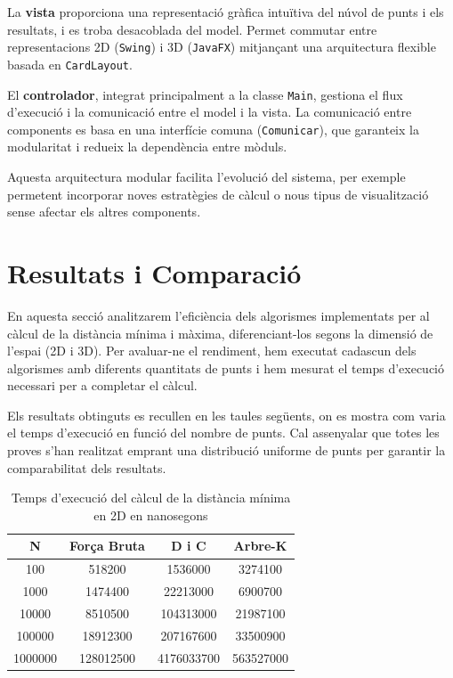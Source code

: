 \documentclass{ieeetj}
\begin{document}
La \textbf{vista} proporciona una representació gràfica intuïtiva del núvol de punts i els resultats, i es troba desacoblada del model. Permet commutar entre representacions 2D (\texttt{Swing}) i 3D (\texttt{JavaFX}) mitjançant una arquitectura flexible basada en \texttt{CardLayout}.

El \textbf{controlador}, integrat principalment a la classe \texttt{Main}, gestiona el flux d’execució i la comunicació entre el model i la vista. La comunicació entre components es basa en una interfície comuna (\texttt{Comunicar}), que garanteix la modularitat i redueix la dependència entre mòduls.

Aquesta arquitectura modular facilita l’evolució del sistema, per exemple permetent incorporar noves estratègies de càlcul o nous tipus de visualització sense afectar els altres components.




\section{Resultats i Comparació}

 En aquesta secció analitzarem l'eficiència dels algorismes implementats per al càlcul de la distància mínima i màxima, diferenciant-los segons la dimensió de l'espai (2D i 3D). Per avaluar-ne el rendiment, hem executat cadascun dels algorismes amb diferents quantitats de punts i hem mesurat el temps d'execució necessari per a completar el càlcul.

Els resultats obtinguts es recullen en les taules següents, on es mostra com varia el temps d'execució en funció del nombre de punts. Cal assenyalar que totes les proves s'han realitzat emprant una distribució uniforme de punts per garantir la comparabilitat dels resultats. 

\begin{table}[H]
    \centering
    \begin{tabular}{|c|c|c|c| }
        \hline
        \textbf{N} & \textbf{Força Bruta} & \textbf{D i C} & \textbf{Arbre-K}  \\
        \hline
         100    & 518200 &    1536000 &  3274100 \\
         1000  &  1474400 & 	22213000 &	6900700     \\
         10000  &   8510500&	104313000	&21987100  \\
         100000  & 18912300 &	207167600 &	33500900  \\
         1000000  & 128012500 &	4176033700 &563527000 \\
      
        \hline
    \end{tabular}
    \vspace{3mm}
    \caption{Temps d'execució del càlcul de la distància mínima en 2D en nanosegons}
    \label{tab:complexitat}
\end{table}
\end{document}
